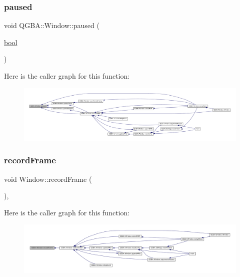 \subsubsection{\texorpdfstring{paused}{paused}}
{\footnotesize\ttfamily void Q\+G\+B\+A\+::\+Window\+::paused (\begin{DoxyParamCaption}\item[{\mbox{\hyperlink{libretro_8h_a4a26dcae73fb7e1528214a068aca317e}{bool}}}]{ }\end{DoxyParamCaption})\hspace{0.3cm}{\ttfamily [signal]}}

Here is the caller graph for this function\+:
\nopagebreak
\begin{figure}[H]
\begin{center}
\leavevmode
\includegraphics[width=350pt]{class_q_g_b_a_1_1_window_a8fb7379452f61684d4554b4b2d7911b8_icgraph}
\end{center}
\end{figure}
\mbox{\label{class_q_g_b_a_1_1_window_aeb3706ed31f139076d72aaa85c1a954b}} 
\subsubsection{\texorpdfstring{record\+Frame}{recordFrame}}
{\footnotesize\ttfamily void Window\+::record\+Frame (\begin{DoxyParamCaption}{ }\end{DoxyParamCaption})\hspace{0.3cm}{\ttfamily [private]}, {\ttfamily [slot]}}

Here is the caller graph for this function\+:
\nopagebreak
\begin{figure}[H]
\begin{center}
\leavevmode
\includegraphics[width=350pt]{class_q_g_b_a_1_1_window_aeb3706ed31f139076d72aaa85c1a954b_icgraph}
\end{center}
\end{figure}
\mbox{\label{class_q_g_b_a_1_1_window_a73b1dabfc487f31687b92bb4bb24a425}} 
